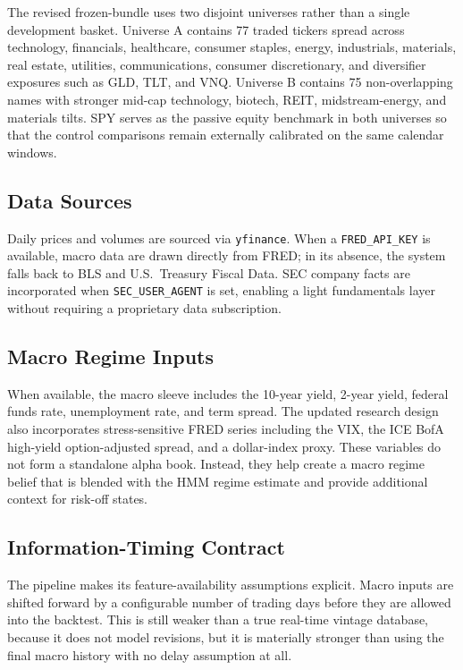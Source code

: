 \documentclass[10pt,twocolumn]{article}
\begin{document}
The revised frozen-bundle uses two disjoint universes rather than a single
development basket. Universe A contains 77 traded tickers spread across
technology, financials, healthcare, consumer staples, energy, industrials,
materials, real estate, utilities, communications, consumer discretionary, and
diversifier exposures such as GLD, TLT, and VNQ. Universe B contains 75
non-overlapping names with stronger mid-cap technology, biotech, REIT,
midstream-energy, and materials tilts. SPY serves as the passive equity
benchmark in both universes so that the control comparisons remain externally
calibrated on the same calendar windows.

\subsection{Data Sources}

Daily prices and volumes are sourced via \texttt{yfinance}. When a
\texttt{FRED\_API\_KEY} is available, macro data are drawn directly from FRED;
in its absence, the system falls back to BLS and U.S.\ Treasury Fiscal Data.
SEC company facts are incorporated when \texttt{SEC\_USER\_AGENT} is set,
enabling a light fundamentals layer without requiring a proprietary data
subscription.

\subsection{Macro Regime Inputs}

When available, the macro sleeve includes the 10-year yield, 2-year yield,
federal funds rate, unemployment rate, and term spread. The updated research
design also incorporates stress-sensitive FRED series including the VIX, the
ICE BofA high-yield option-adjusted spread, and a dollar-index proxy. These
variables do not form a standalone alpha book. Instead, they help create a
macro regime belief that is blended with the HMM regime estimate and provide
additional context for risk-off states.

\subsection{Information-Timing Contract}

The pipeline makes its feature-availability assumptions explicit. Macro inputs are
shifted forward by a configurable number of trading days before they are allowed
into the backtest. This is still weaker than a true real-time vintage database,
because it does not model revisions, but it is materially stronger than using
the final macro history with no delay assumption at all.
\end{document}
